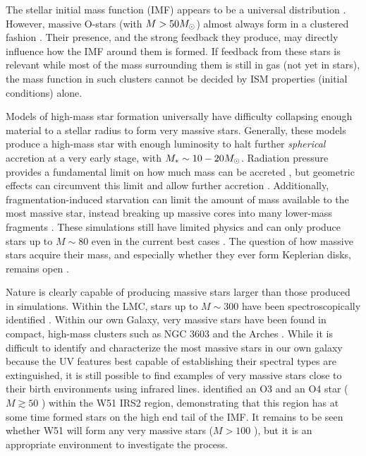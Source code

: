 \documentclass{emulateapj}
\begin{document}
The stellar initial mass function (IMF) appears to be a universal distribution
\citep{Bastian2010a}.  However, massive  O-stars (with $M>50 M_{\odot}$)
almost always form in a clustered fashion \citep[in proto-clusters or
proto-associations;][]{de-Wit2004a,de-Wit2005a,Parker2007a}. %
Their presence, and the strong feedback they produce, may directly influence
how the IMF around them is formed.  If feedback from these stars is relevant
while most of the  mass surrounding them is still in gas (not yet in stars),
the mass function in such clusters cannot be decided by ISM properties
(initial conditions) alone. 

Models of high-mass star formation universally have difficulty collapsing enough
material to a stellar radius to form very massive stars.  Generally, these models
produce a high-mass star with enough luminosity to halt further
\emph{spherical} accretion at a very early stage, with $M_* \sim 10-20M_{\odot}$.
Radiation pressure provides a fundamental limit on how much mass can be
accreted \citep{Wolfire1987a,Osorio1999a}, but geometric effects can circumvent
this limit and allow further accretion
\citep{Yorke2002a,Krumholz2005b,Krumholz2009a,Krumholz2009b,Kuiper2012a,Kuiper2013c,Rosen2016a}.
Additionally, fragmentation-induced starvation can limit the amount of mass
available to the most massive star, instead breaking up massive cores into many
lower-mass fragments \citep{Peters2010a}.  These simulations still have limited
physics and can only produce stars up to $M\sim80$ \msun even in the current
best cases \citep{Kuiper2015a,Kuiper2016a}.  The question of how massive stars
acquire their mass, and especially whether they ever form Keplerian disks,
remains open \citep{Beltran2016b}.

Nature is clearly capable of producing massive stars larger than those produced
in simulations.  Within the LMC, stars up to $M\sim300$ \msun have been
spectroscopically identified \citep{Crowther2016a}.  Within our own Galaxy,
very massive stars have been found in compact, high-mass clusters such as NGC
3603 and the Arches \citep{Crowther2010a}.  While it is difficult to identify
and characterize the most massive stars in our own galaxy because the UV
features best capable of establishing their spectral types are 
extinguished,
it is still possible to find examples of very massive stars close to their
birth environments using infrared lines.  \citet{Barbosa2008a} identified an O3
and an O4 star ($M\gtrsim50$ \msun) within the W51 IRS2 region, demonstrating
that this region has at some time formed stars on the high
end tail of the IMF.  It remains to be seen whether W51 will form any very
massive stars ($M>100$ \msun), but it is  an appropriate environment to
investigate the process.
\end{document}
